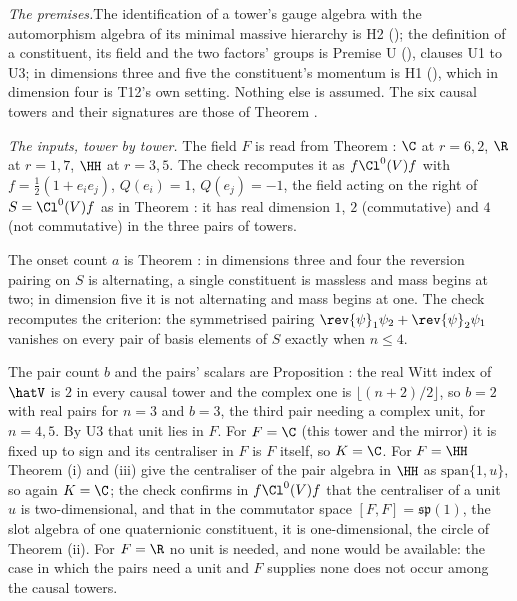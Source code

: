 \textit{The premises.}\enspace The identification of a tower's gauge algebra with the automorphism algebra of its minimal massive hierarchy is H2 (); the definition of a constituent, its field and the two factors' groups is Premise U (), clauses U1 to U3; in dimensions three and five the constituent's momentum is H1 (), which in dimension four is T12's own setting. Nothing else is assumed. The six causal towers and their signatures are those of Theorem .

\emph{The inputs, tower by tower.}  The field $F$ is read from Theorem : $\C$ at $r = 6, 2$, $\R$ at $r = 1, 7$, $\HH$ at $r = 3, 5$. The check recomputes it as $f\Cl^{0}(V)f$ with $f = \tfrac12(1 + e_{i}e_{j})$, $Q(e_{i}) = 1$, $Q(e_{j}) = -1$, the field acting on the right of $S = \Cl^{0}(V)f$ as in Theorem : it has real dimension $1$, $2$ (commutative) and $4$ (not commutative) in the three pairs of towers.

The onset count $a$ is Theorem : in dimensions three and four the reversion pairing on $S$ is alternating, a single constituent is massless and mass begins at two; in dimension five it is not alternating and mass begins at one. The check recomputes the criterion: the symmetrised pairing $\rev{\psi}_{1}\psi_{2} + \rev{\psi}_{2}\psi_{1}$ vanishes on every pair of basis elements of $S$ exactly when $n \le 4$.

The pair count $b$ and the pairs' scalars are Proposition : the real Witt index of $\hatV$ is $2$ in every causal tower and the complex one is $\lfloor (n+2)/2 \rfloor$, so $b = 2$ with real pairs for $n = 3$ and $b = 3$, the third pair needing a complex unit, for $n = 4, 5$. By U3 that unit lies in $F$. For $F = \C$ (this tower and the mirror) it is fixed up to sign and its centraliser in $F$ is $F$ itself, so $K = \C$. For $F = \HH$ Theorem (i) and (iii) give the centraliser of the pair algebra in $\HH$ as $\mathrm{span}\{1, u\}$, so again $K = \C$; the check confirms in $f\Cl^{0}(V)f$ that the centraliser of a unit $u$ is two-dimensional, and that in the commutator space $[F, F] = \mathfrak{sp}(1)$, the slot algebra of one quaternionic constituent, it is one-dimensional, the circle of Theorem (ii). For $F = \R$ no unit is needed, and none would be available: the case in which the pairs need a unit and $F$ supplies none does not occur among the causal towers.

